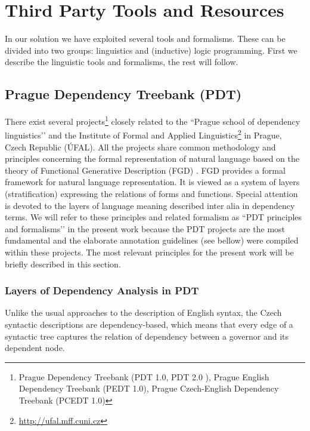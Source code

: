 \chapter{Third Party Tools and Resources} \label{sec:ch_third_party}

\graphicspath{{../img/ch30/}}


In our solution we have exploited several tools and formalisms. These can be divided into two groups: linguistics and (inductive) logic programming. First we describe the linguistic tools and formalisms, the rest will follow.



\section{Prague Dependency Treebank (PDT)} \label{sec:third_pdt}
There exist several projects\footnote{Prague Dependency Treebank
 (PDT 1.0, PDT 2.0 \citep{biblio:PDT20_CD}), Prague English Dependency Treebank (PEDT 1.0), Prague Czech-English Dependency Treebank (PCEDT 1.0)} 
closely related to the ``Prague school of dependency linguistics’’ and the Institute of Formal and Applied Linguistics\footnote{\url{http://ufal.mff.cuni.cz}} in Prague, Czech Republic (ÚFAL). All the projects share common methodology and principles concerning the formal representation of natural language %
 based on the theory of Functional Generative Description (FGD) \citep{SgallHajicovaPanevova1986}. FGD provides a formal framework for natural language representation. It is viewed as a system of layers (stratification) expressing the relations of forms and functions. Special attention is devoted to the layers of language meaning described inter alia in dependency terms.
We will refer to these principles and related formalism as ``PDT principles and formalisms’’ in the present work because the PDT projects are the most fundamental and the elaborate annotation guidelines (see bellow) were compiled within these projects. The most relevant principles for the present work will be briefly described in this section.

\subsection{Layers of Dependency Analysis in PDT} \label{sec:third_PDT_layers}

Unlike the usual approaches to the description of English syntax, the Czech syntactic descriptions are dependency-based, which means that every edge of a syntactic tree captures the relation of dependency between a governor and its dependent node. 

